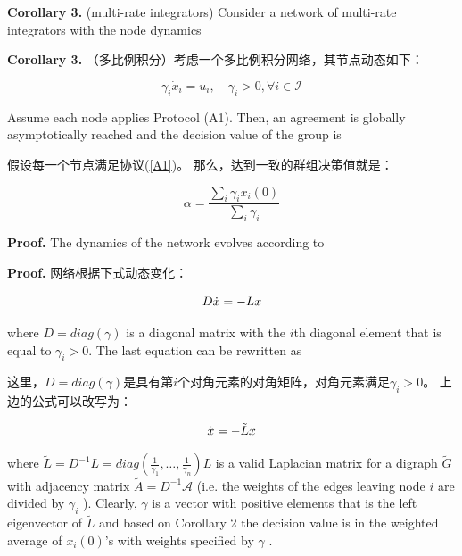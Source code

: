 \documentclass{article}
\begin{document}
{\color[gray]{0.5}
\noindent \textbf{Corollary 3.} (multi-rate integrators) Consider a network of multi-rate integrators with the node dynamics
}

\noindent \textbf{Corollary 3.} （多比例积分）考虑一个多比例积分网络，其节点动态如下：

\begin{equation}
    \gamma_i \dot{x}_i=u_i,\quad \gamma_i>0,\forall i \in \mathcal{I}
    \tag{20}
    \label{20}
\end{equation}

{\color[gray]{0.5}
\noindent Assume each node applies Protocol (A1). 
Then, an agreement is globally asymptotically reached and the decision value of the group is
}

\noindent 假设每一个节点满足协议(\ref{A1})。
那么，达到一致的群组决策值就是：

\begin{equation}
    \alpha = \frac{\sum_i \gamma_ix_i(0)}{\sum_i\gamma_i}
    \tag{21}
    \label{21}
\end{equation}

{\color[gray]{0.5}
\noindent \textbf{Proof.} The dynamics of the network evolves according to
}

\noindent \textbf{Proof.} 网络根据下式动态变化：

\begin{equation}
    D\dot{x} = -Lx
    \notag
\end{equation}

{\color[gray]{0.5}
\noindent where $D=diag(\gamma)$ is a diagonal matrix with the $i$th diagonal element that is equal to $\gamma_i>0$. 
The last equation can be rewritten as
}

\noindent 这里，$D=diag(\gamma)$是具有第$i$个对角元素的对角矩阵，对角元素满足$\gamma_i>0$。
上边的公式可以改写为：

\begin{equation}
    \dot{x} = -\tilde{L}x
    \notag
\end{equation}

{\color[gray]{0.5}
\noindent where $\tilde{L} = D^{-1}L = diag(\frac{1}{\gamma_1},\dots,\frac{1}{\gamma_n})L$ is a valid Laplacian matrix for a digraph $\tilde{G}$ with adjacency matrix $\tilde{A}=D^{-1}\mathcal{A}$ (i.e. the weights of the edges leaving node $i$ are divided by $\gamma_i$ ). 
Clearly, $\gamma$ is a vector with positive elements that is the left eigenvector of $\tilde{L}$ and based on Corollary 2 the decision value is in the weighted average of $x_i(0)$’s with weights speciﬁed by $\gamma$ .
}
\end{document}

